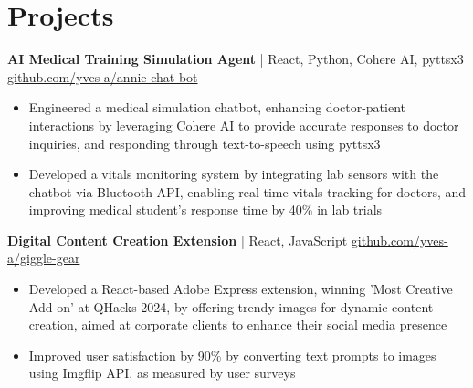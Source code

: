 

\section*{Projects}

\textbf{AI Medical Training Simulation Agent} | React, Python, Cohere AI, pyttsx3  \hfill \href{https://github.com/yves-a/annie-chat-bot}{github.com/yves-a/annie-chat-bot} \\
\vspace{-5pt}
\begin{itemize}
  \item Engineered a medical simulation chatbot, enhancing doctor-patient interactions by leveraging Cohere AI to provide accurate responses to doctor inquiries, and responding through text-to-speech using pyttsx3
  \item Developed a vitals monitoring system by integrating lab sensors with the chatbot via Bluetooth API, enabling real-time vitals tracking for doctors, and improving medical student's response time by 40\% in lab trials
\end{itemize}
\textbf{Digital Content Creation Extension} | React, JavaScript \hfill \href{https://github.com/yves-a/giggle-gear}{github.com/yves-a/giggle-gear} \\
\vspace{-5pt}
\begin{itemize}
  \item Developed a React-based Adobe Express extension, winning 'Most Creative Add-on' at QHacks 2024, by offering trendy images for dynamic content creation, aimed at corporate clients to enhance their social media presence
  \item Improved user satisfaction by 90\% by converting text prompts to images using Imgflip API, as measured by user surveys
\end{itemize}

